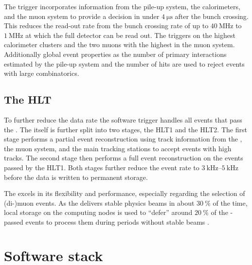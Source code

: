The \LZero trigger incorporates information from the \VELO pile-up system, the
calorimeters, and the muon system to provide a decision in under
$\SI{4}{\micro\second}$ after the bunch crossing. This reduces the read-out rate
from the \LHC bunch crossing rate of up to $\SI{40}{\mega\hertz}$ to
$\SI{1}{\mega\hertz}$ at which the full detector can be read out. The \LZero
triggers on the highest \ET calorimeter clusters and the two muons with the
highest \pT in the muon system. Additionally global event properties as the
number of primary \protonproton interactions estimated by the \VELO pile-up
system and the number of \SPD hits are used to reject events with large
combinatorics.

\subsection{The \acl*{HLT}}
\label{sec:lhcb_experiment:trigger:hlt}

To further reduce the data rate the \HLT software trigger handles all events
that pass the \LZero. The \HLT itself is further split into two stages, the
\acs{HLT}1 and the \acs{HLT}2. The first stage performs a partial event
reconstruction using track information from the \VELO, the muon system, and the
main tracking stations to accept events with high \pT tracks. The second \HLT
stage then performs a full event reconstruction on the events passed by the
\acs{HLT}1. Both \HLT stages further reduce the event rate to
$\SIrange[range-units = single, range-phrase = -]{3}{5}{\kilo\hertz}$ before the
data is written to permanent storage.

The \HLT excels in its flexibility and performance, especially regarding the
selection of (di-)muon events. As the \LHC delivers stable physics beams in
about $\SI{30}{\percent}$ of the time, local storage on the computing nodes is
used to \enquote{defer} around $\SI{20}{\percent}$ of the \LZero-passed events
to process them during periods without stable beams \cite{Frank:2014ixa}.

\section{Software stack}
\label{sec:lhcb_experiment:software}


